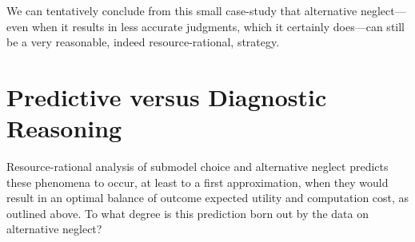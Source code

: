 \documentclass[10pt,letterpaper]{article}
\begin{document}
We can tentatively conclude from this small case-study that alternative neglect---even when it results in less accurate judgments, which it certainly does---can still be a very reasonable, indeed resource-rational, strategy. 

\section{Predictive versus Diagnostic Reasoning}

Resource-rational analysis of submodel choice and alternative neglect predicts these phenomena to occur, at least to a first approximation, when they would result in 
an optimal balance of outcome expected utility and computation cost,
as outlined above. To what degree is this prediction born out by the data on alternative neglect?
\end{document}
